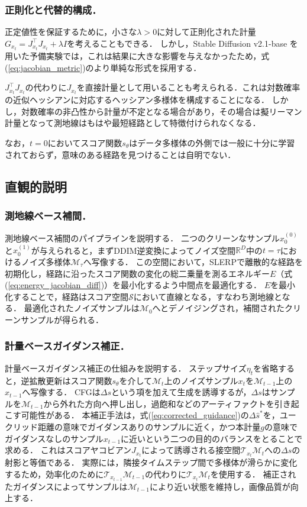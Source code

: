 \documentclass[MIRU,submit]{miru2026j}
\theoremstyle{definition}
\newcommand{\gM}{{\mathcal{M}}}
\newcommand{\gT}{{\mathcal{T}}}
\newcommand{\R}{\mathbb{R}}
\newcommand{\sss}[1]{{\scriptscriptstyle (#1)}}
\begin{document}
\subsubsection{正則化と代替的構成．}
正定値性を保証するために，小さな$\lambda>0$に対して正則化された計量$G_{x_t} = J_{x_t}^\top J_{x_t}+\lambda I$を考えることもできる．
しかし，Stable Diffusion v2.1-base \cite{Rombach2022}を用いた予備実験では，これは結果に大きな影響を与えなかったため，式(\ref{eq:jacobian_metric})のより単純な形式を採用する．

$J_{x_t}^\top J_{x_t}$の代わりに$J_{x_t}$を直接計量として用いることも考えられる．これは対数確率の近似ヘッシアンに対応するヘッシアン多様体を構成することになる．
しかし，対数確率の非凸性から計量が不定となる場合があり，その場合は擬リーマン計量となって測地線はもはや最短経路として特徴付けられなくなる．

なお，$t=0$においてスコア関数$s_\theta$はデータ多様体の外側では一般に十分に学習されておらず，意味のある経路を見つけることは自明でない．

\subsection{直観的説明}\label{appendix:intuitive_explanation}

\subsubsection{測地線ベース補間．}
測地線ベース補間のパイプラインを説明する．
二つのクリーンなサンプル$x_0^\sss{0}$と$x_0^\sss{1}$が与えられると，まずDDIM逆変換によってノイズ空間$\R^D$中の$t=\tau$におけるノイズ多様体$\gM_\tau$へ写像する．
この空間において，SLERPで離散的な経路を初期化し，経路に沿ったスコア関数の変化の総二乗量を測るエネルギー$E$（式(\ref{eq:energy_jacobian_diff})）を最小化するよう中間点を最適化する．
$E$を最小化することで，経路はスコア空間$\mathcal{S}$において直線となる，すなわち測地線となる．
最適化されたノイズサンプルは$\gM_0$へとデノイジングされ，補間されたクリーンサンプルが得られる．

\subsubsection{計量ベースガイダンス補正．}
計量ベースガイダンス補正の仕組みを説明する．
ステップサイズ$\eta_t$を省略すると，逆拡散更新はスコア関数$s_\theta$を介して$\gM_t$上のノイズサンプル$x_t$を$\gM_{t-1}$上の$x_{t-1}$へ写像する．
CFGは$\Delta s$という項を加えて生成を誘導するが，$\Delta s$はサンプルを$\gM_{t-1}$から外れた方向へ押し出し，過飽和などのアーティファクトを引き起こす可能性がある．
本補正手法は，式(\ref{eq:corrected_guidance})の$\Delta\hat{s}^*$を，ユークリッド距離の意味でガイダンスありのサンプルに近く，かつ本計量$g$の意味でガイダンスなしのサンプル$x_{t-1}$に近いという二つの目的のバランスをとることで求める．
これはスコアヤコビアン$J_{x_t}$によって誘導される接空間$\gT_{x_t}\gM_t$への$\Delta s$の射影と等価である．
実際には，隣接タイムステップ間で多様体が滑らかに変化するため，効率化のために$\gT_{x_{t-1}}\gM_{t-1}$の代わりに$\gT_{x_t}\gM_t$を使用する．
補正されたガイダンスによってサンプルは$\gM_{t-1}$により近い状態を維持し，画像品質が向上する．
\end{document}
